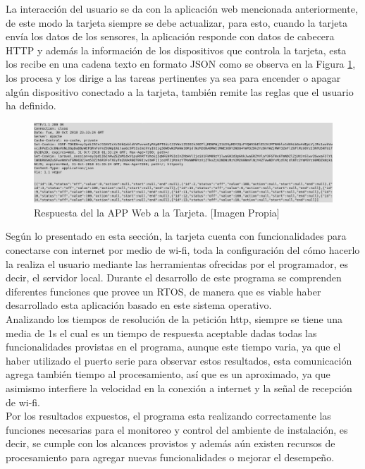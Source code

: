 La interacción del usuario se da con la aplicación web mencionada anteriormente, de este modo la tarjeta siempre se debe actualizar, para esto, cuando la tarjeta envía los datos de los sensores, la aplicación responde con datos de cabecera HTTP y además la información de los dispositivos que controla la tarjeta, esta los recibe en una cadena texto en formato JSON como se observa en la Figura \ref{fig:httprqstesp}, los procesa y los dirige a las tareas pertinentes ya sea para encender o apagar algún dispositivo conectado a la tarjeta, también remite las reglas que el usuario ha definido.\\

\begin{figure}[H]
	\centering
	\caption[Respuesta del la APP Web a la Tarjeta.]{Respuesta del la APP Web a la Tarjeta.  [Imagen Propia]}
	\label{fig:httprqstesp}
	\includegraphics[width=0.8\linewidth]{Imagenes/HTTPRqstesp}
\end{figure}

Según lo presentado en esta sección, la tarjeta cuenta con funcionalidades para conectarse con internet por medio de wi-fi, toda la configuración del cómo hacerlo la realiza el usuario mediante las herramientas ofrecidas por el programador, es decir, el servidor local. Durante el desarrollo de este programa se comprenden diferentes funciones que provee un RTOS, de manera que es viable haber desarrollado esta aplicación basado en este sistema operativo.\\

Analizando los tiempos de resolución de la petición http, siempre se tiene una media de 1s el cual es un tiempo de respuesta aceptable dadas todas las funcionalidades provistas en el programa, aunque este tiempo varia, ya que el haber utilizado el puerto serie para observar estos resultados, esta comunicación agrega también tiempo al procesamiento, así que es un aproximado, ya que asimismo interfiere la velocidad en la conexión a internet y la señal de recepción de wi-fi.\\

Por los resultados expuestos, el programa esta realizando correctamente las funciones necesarias para el monitoreo y control del ambiente de instalación, es decir, se cumple con los alcances provistos y además aún existen recursos de procesamiento para agregar nuevas funcionalidades o mejorar el desempeño.

